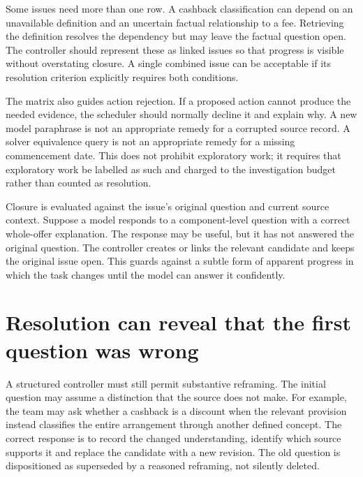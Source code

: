 
Some issues need more than one row. A cashback classification can depend on an
unavailable definition and an uncertain factual relationship to a fee. Retrieving
the definition resolves the dependency but may leave the factual question open.
The controller should represent these as linked issues so that progress is visible
without overstating closure. A single combined issue can be acceptable if its
resolution criterion explicitly requires both conditions.

The matrix also guides action rejection. If a proposed action cannot produce the
needed evidence, the scheduler should normally decline it and explain why. A new
model paraphrase is not an appropriate remedy for a corrupted source record. A
solver equivalence query is not an appropriate remedy for a missing commencement
date. This does not prohibit exploratory work; it requires that exploratory work
be labelled as such and charged to the investigation budget rather than counted
as resolution.

Closure is evaluated against the issue's original question and current source
context. Suppose a model responds to a component-level question with a correct
whole-offer explanation. The response may be useful, but it has not answered the
original question. The controller creates or links the relevant candidate and
keeps the original issue open. This guards against a subtle form of apparent
progress in which the task changes until the model can answer it confidently.

\section{Resolution can reveal that the first question was wrong}
\label{merge:M06:10}


A structured controller must still permit substantive reframing. The initial
question may assume a distinction that the source does not make. For example,
the team may ask whether a cashback is a discount when the relevant provision
instead classifies the entire arrangement through another defined concept.
The correct response is to record the changed understanding, identify which
source supports it and replace the candidate with a new revision. The old question
is dispositioned as superseded by a reasoned reframing, not silently deleted.


